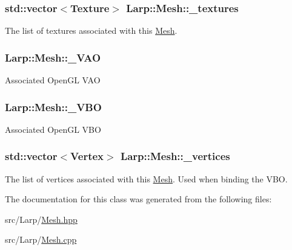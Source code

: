 \subsubsection[{\texorpdfstring{\+\_\+textures}{_textures}}]{\setlength{\rightskip}{0pt plus 5cm}std\+::vector$<${\bf Texture}$>$ Larp\+::\+Mesh\+::\+\_\+textures}\hypertarget{classLarp_1_1Mesh_a54c9edf45e99fb0261a39bfc3e8ff091}{}\label{classLarp_1_1Mesh_a54c9edf45e99fb0261a39bfc3e8ff091}
The list of textures associated with this \hyperlink{classLarp_1_1Mesh}{Mesh}. 
\subsubsection[{\texorpdfstring{\+\_\+\+V\+AO}{_VAO}}]{ Larp\+::\+Mesh\+::\+\_\+\+V\+AO\hspace{0.3cm}{\ttfamily [private]}}\hypertarget{classLarp_1_1Mesh_a94ba362a5c5682adf83257c29d3e1574}{}\label{classLarp_1_1Mesh_a94ba362a5c5682adf83257c29d3e1574}
Associated Open\+GL V\+AO 
\subsubsection[{\texorpdfstring{\+\_\+\+V\+BO}{_VBO}}]{ Larp\+::\+Mesh\+::\+\_\+\+V\+BO\hspace{0.3cm}{\ttfamily [private]}}\hypertarget{classLarp_1_1Mesh_a222c9e89d16765db6a6362127a0613f7}{}\label{classLarp_1_1Mesh_a222c9e89d16765db6a6362127a0613f7}
Associated Open\+GL V\+BO 
\subsubsection[{\texorpdfstring{\+\_\+vertices}{_vertices}}]{\setlength{\rightskip}{0pt plus 5cm}std\+::vector$<${\bf Vertex}$>$ Larp\+::\+Mesh\+::\+\_\+vertices}\hypertarget{classLarp_1_1Mesh_af77086ebadfb8b0f4fb3c2e5f39d6a43}{}\label{classLarp_1_1Mesh_af77086ebadfb8b0f4fb3c2e5f39d6a43}
The list of vertices associated with this \hyperlink{classLarp_1_1Mesh}{Mesh}. Used when binding the V\+BO. 

The documentation for this class was generated from the following files\+:\begin{DoxyCompactItemize}
\item 
src/\+Larp/\hyperlink{Mesh_8hpp}{Mesh.\+hpp}\item 
src/\+Larp/\hyperlink{Mesh_8cpp}{Mesh.\+cpp}\end{DoxyCompactItemize}
